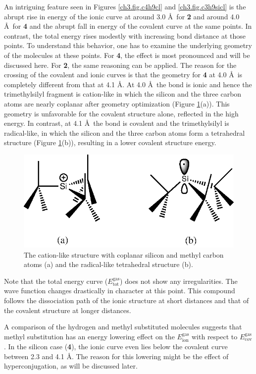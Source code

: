 An intriguing feature seen in Figures \ref{ch3.fig.c4h9cl} and \ref{ch3.fig.c3h9sicl} is the abrupt rise in energy of the ionic curve at around 3.0 \AA\ for \textbf{2} and around 4.0 \AA\ for \textbf{4} and the abrupt fall in energy of the covalent curve at the same points. In contrast, the total energy rises modestly with increasing bond distance at those points. To understand this behavior, one has to examine the underlying geometry of the molecules at these points. For \textbf{4}, the effect is most pronounced and will be discussed here. For \textbf{2}, the same reasoning can be applied. The reason for the crossing of the covalent and ionic curves is that the geometry for \textbf{4} at 4.0 \AA\ is completely different from that at 4.1 \AA. At 4.0 \AA\ the bond is ionic and hence the trimethylsilyl fragment is cation-like in which the silicon and the three carbon atoms are nearly coplanar after geometry optimization (Figure \ref{ch3.fig.crossing}(a)). This geometry is unfavorable for the covalent structure alone, reflected in the high energy.  In contrast, at 4.1 \AA\  the bond is covalent and the trimethylsilyl is radical-like, in which the silicon and the three carbon atoms form a tetrahedral structure (Figure \ref{ch3.fig.crossing}(b)), resulting in a lower covalent structure energy. 
\begin{figure}[htbp]
\center
\includegraphics[scale=1.0]{dissociation/figures/crossing.eps}
\caption{The cation-like structure with coplanar silicon and methyl carbon atoms (a) and the radical-like tetrahedral structure (b).}
\label{ch3.fig.crossing}
\end{figure}
Note that the total energy curve ($E_\mathrm{tot}^\mathrm{gas}$) does not show any irregularities.  The wave function changes drastically in character at this point. This compound follows the dissociation path of the ionic structure at short distances and that of the covalent structure at longer distances. 

A comparison of the hydrogen and methyl substituted molecules suggests that methyl substitution has an energy lowering effect on the $E_\mathrm{ion}^\mathrm{gas}$ with respect to $E_\mathrm{cov}^\mathrm{gas}$. In the silicon case (\textbf{4}), the ionic curve even lies below the covalent curve between 2.3 and 4.1 \AA. The reason for this lowering might be the effect of hyperconjugation, as will be discussed later.

